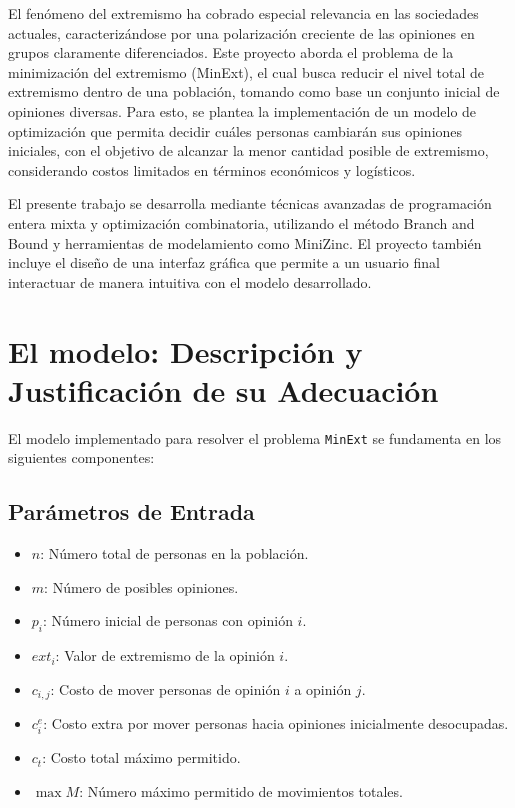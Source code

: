 \documentclass[11pt,letter]{article}
\begin{document}
El fenómeno del extremismo ha cobrado especial relevancia en las sociedades actuales, caracterizándose por una polarización creciente de las opiniones en grupos claramente diferenciados. Este proyecto aborda el problema de la minimización del extremismo (MinExt), el cual busca reducir el nivel total de extremismo dentro de una población, tomando como base un conjunto inicial de opiniones diversas. Para esto, se plantea la implementación de un modelo de optimización que permita decidir cuáles personas cambiarán sus opiniones iniciales, con el objetivo de alcanzar la menor cantidad posible de extremismo, considerando costos limitados en términos económicos y logísticos.

El presente trabajo se desarrolla mediante técnicas avanzadas de programación entera mixta y optimización combinatoria, utilizando el método Branch and Bound y herramientas de modelamiento como MiniZinc. El proyecto también incluye el diseño de una interfaz gráfica que permite a un usuario final interactuar de manera intuitiva con el modelo desarrollado.


\newpage


\newpage
\section{El modelo: Descripción y Justificación de su Adecuación}

El modelo implementado para resolver el problema \texttt{MinExt} se fundamenta en los siguientes componentes:

\subsection{Parámetros de Entrada}
\begin{itemize}
  \item $n$: Número total de personas en la población.
  \item $m$: Número de posibles opiniones.
  \item $p_i$: Número inicial de personas con opinión $i$.
  \item $\mathit{ext}_i$: Valor de extremismo de la opinión $i$.
  \item $c_{i,j}$: Costo de mover personas de opinión $i$ a opinión $j$.
  \item $c^e_i$: Costo extra por mover personas hacia opiniones inicialmente desocupadas.
  \item $c_t$: Costo total máximo permitido.
  \item $\max M$: Número máximo permitido de movimientos totales.
\end{itemize}
\end{document}
